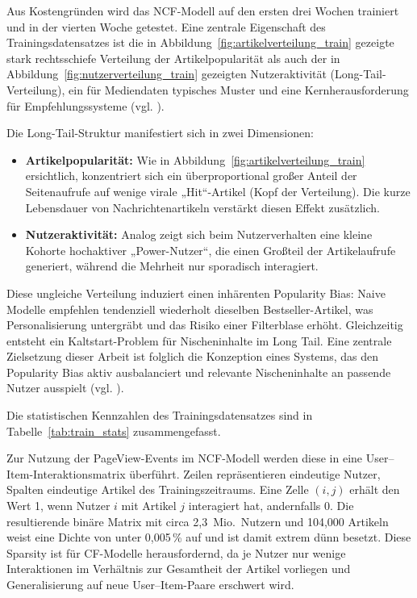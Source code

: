 Aus Kostengründen wird das NCF-Modell auf den ersten drei Wochen trainiert und in der vierten Woche getestet. 
Eine zentrale Eigenschaft des Trainingsdatensatzes ist die in Abbildung~\ref{fig:artikelverteilung_train} gezeigte stark 
rechtsschiefe Verteilung der Artikelpopularität als auch der in Abbildung~\ref{fig:nutzerverteilung_train}
gezeigten Nutzeraktivität (Long-Tail-Verteilung), ein für Mediendaten typisches Muster und eine Kernherausforderung für 
Empfehlungssysteme (vgl. \cite{wu_personalized_2022, raza_news_2020}).


Die Long-Tail-Struktur manifestiert sich in zwei Dimensionen:
\begin{itemize}
    \item \textbf{Artikelpopularität:} Wie in Abbildung~\ref{fig:artikelverteilung_train} ersichtlich, 
    konzentriert sich ein \newline überproportional großer Anteil der Seitenaufrufe auf wenige virale „Hit“-Artikel 
    (Kopf der Verteilung). Die kurze Lebensdauer von Nachrichtenartikeln verstärkt diesen Effekt zusätzlich.
    \item \textbf{Nutzeraktivität:} Analog zeigt sich beim Nutzerverhalten eine kleine Kohorte hochaktiver 
    „Power-Nutzer“, die einen Großteil der Artikelaufrufe generiert, während die Mehrheit nur sporadisch interagiert.
\end{itemize}
Diese ungleiche Verteilung induziert einen inhärenten Popularity Bias: Naive Modelle empfehlen tendenziell 
wiederholt dieselben Bestseller-Artikel, was Personalisierung untergräbt und das Risiko einer Filterblase erhöht. 
Gleichzeitig entsteht ein Kaltstart-Problem für Nischeninhalte im Long Tail. Eine zentrale Zielsetzung 
dieser Arbeit ist folglich die Konzeption eines Systems, das den Popularity Bias aktiv ausbalanciert und 
relevante Nischeninhalte an passende Nutzer ausspielt (vgl. \cite{Abdollahpouri_Popularity_Bias_2019}).


Die statistischen Kennzahlen des Trainingsdatensatzes sind in Tabelle~\ref{tab:train_stats} zusammengefasst.


Zur Nutzung der PageView-Events im \ac{NCF}-Modell werden diese in eine \newline User–Item-Interaktionsmatrix überführt. 
Zeilen repräsentieren eindeutige Nutzer, Spalten eindeutige Artikel des Trainingszeitraums. 
Eine Zelle $(i,j)$ erhält den Wert 1, wenn Nutzer $i$ mit Artikel $j$ interagiert hat, andernfalls 0. 
Die resultierende binäre Matrix mit circa 2{,}3~Mio.\ Nutzern und 104{,}000 Artikeln weist eine Dichte 
von unter 0{,}005\,\% auf und ist damit extrem dünn besetzt. Diese Sparsity ist für \ac{CF}-Modelle herausfordernd, 
da je Nutzer nur wenige Interaktionen im Verhältnis zur Gesamtheit der Artikel vorliegen und Generalisierung auf 
neue User–Item-Paare erschwert wird.

